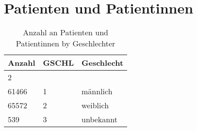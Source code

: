 \section{Patienten und Patientinnen}
\begin{center}
 \begin{longtable}{|p{2.3cm}|p{2cm}|p{2.5cm}|} 
  \caption{Anzahl an Patienten und Patientinnen by Geschlechter} \\
  \hline
\rowcolor{lightgray} Anzahl & GSCHL & Geschlecht \\ \hline
\endhead
2 &   &  \\ \hline
61466 & 1 & männlich \\ \hline
65572 & 2 & weiblich \\ \hline
539 & 3 & unbekannt \\ \hline
\end{longtable}
\end{center}
